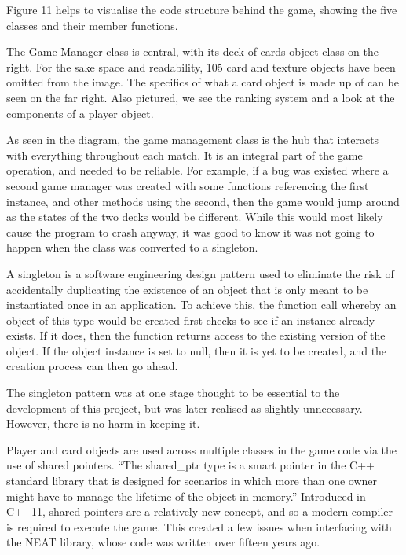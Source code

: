 \documentclass[12pt,a4paper]{article}
\begin{document}
Figure 11 helps to visualise the code structure behind the game, showing the five classes and their member functions. 

The Game Manager class is central, with its deck of cards object class on the right. For the sake space and readability, 105 card and texture objects have been omitted from the image. The specifics of what a card object is made up of can be seen on the far right. Also pictured, we see the ranking system and a look at the components of a player object.

As seen in the diagram, the game management class is the hub that interacts with everything throughout each match. It is an integral part of the game operation, and needed to be reliable. For example, if a bug was existed where a second game manager was created with some functions referencing the first instance, and other methods using the second, then the game would jump around as the states of the two decks would be different. While this would most likely cause the program to crash anyway, it was good to know it was not going to happen when the class was converted to a singleton.

A singleton is a software engineering design pattern used to eliminate the risk of accidentally duplicating the existence of an object that is only meant to be instantiated once in an application\citep{31}. To achieve this, the function call whereby an object of this type would be created first checks to see if an instance already exists. If it does, then the function returns access to the existing version of the object. If the object instance is set to null, then it is yet to be created, and the creation process can then go ahead.

The singleton pattern was at one stage thought to be essential to the development of this project, but was later realised as slightly unnecessary. However, there is no harm in keeping it.

Player and card objects are used across multiple classes in the game code via the use of shared pointers. \enquote{The shared\_ptr type is a smart pointer in the C++ standard library that is designed for scenarios in which more than one owner might have to manage the lifetime of the object in memory\citep{sharedptr}.} Introduced in C++11, shared pointers are a relatively new concept, and so a modern compiler is required to execute the game. This created a few issues when interfacing with the NEAT library, whose code was written over fifteen years ago. \\
\end{document}
